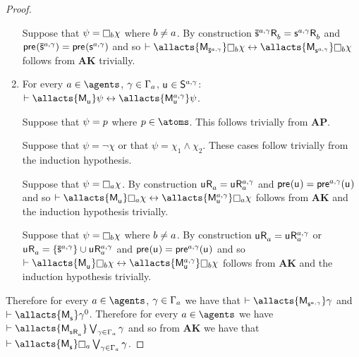 \begin{proof}
\begin{enumerate}
        Suppose that $\psi = \necessary[\agentB] \chi$ where $b \neq a$.
        By construction $\aPStateS[\agentA,\gamma] \aAccessibility{\agentB} = \aStateS[\agentA,\gamma] \aAccessibility{\agentB}$ and $\aPrecondition(\aPStateS[\agentA,\gamma]) = \aPrecondition(\aStateS[\agentA,\gamma])$ and so $\proves \allacts{\aPModel{\aPStateS[\agentA,\gamma]}} \necessary[\agentB] \chi \iff \allacts{\aPModel{\aStateS[\agentA,\gamma]}} \necessary[\agentB] \chi$ follows from {\bf AK} trivially.

    \item For every $\agentA \in \agents$, $\gamma \in \Gamma_a$, $\aStateU \in \aStates[\agentA,\gamma]$: $\proves \allacts{\aPModel{\aStateU}} \psi \iff \allacts{\aPModel[\agentA,\gamma]{\aStateU}} \psi$.

        Suppose that $\psi = p$ where $\atomP \in \atoms$. 
        This follows trivially from {\bf AP}.

        Suppose that $\psi = \neg \chi$ or that $\psi = \chi_1 \land \chi_2$. These cases follow trivially from the induction hypothesis.

        Suppose that $\psi = \necessary[\agentA] \chi$.
        By construction $\aStateU \aAccessibility{\agentA} = \aStateU \aAccessibility[\agentA,\gamma]{\agentA}$ and $\aPrecondition(\aStateU) = \aPrecondition[\agentA,\gamma](\aStateU)$ and so $\proves \allacts{\aPModel{\aStateU}} \necessary[\agentA] \chi \iff \allacts{\aPModel[\agentA,\gamma]{\aStateU}} \necessary[\agentA] \chi$ follows from {\bf AK} and the induction hypothesis trivially.

        Suppose that $\psi = \necessary[\agentB] \chi$ where $b \neq a$.
        By construction $\aStateU \aAccessibility{\agentA} = \aStateU \aAccessibility[\agentA,\gamma]{\agentA}$ or $\aStateU \aAccessibility{\agentA} = \{\aPStateS[\agentA,\gamma]\} \cup \aStateU \aAccessibility[\agentA,\gamma]{\agentA}$ and $\aPrecondition(\aStateU) = \aPrecondition[\agentA,\gamma](\aStateU)$ and so $\proves \allacts{\aPModel{\aStateU}} \necessary[\agentB] \chi \iff \allacts{\aPModel[\agentA,\gamma]{\aStateU}} \necessary[\agentB] \chi$ follows from {\bf AK} and the induction hypothesis trivially.
\end{enumerate}

Therefore for every $\agentA \in \agents$, $\gamma \in \Gamma_a$ we have that $\proves \allacts{\aPModel{\aStateS[\agentA,\gamma]}} \gamma$ and $\proves \allacts{\aPModel{\aStateS}} \gamma^0$.
Therefore for every $\agentA \in \agents$ we have $\proves \allacts{\aPModel{\aStateS \aAccessibility{\agentA}}} \bigvee_{\gamma \in \Gamma_\agentA} \gamma$ and so from {\bf AK} we have that $\proves \allacts{\aPModel{\aStateS}} \necessary[\agentA] \bigvee_{\gamma \in \Gamma_\agentA} \gamma$.


\end{proof}
